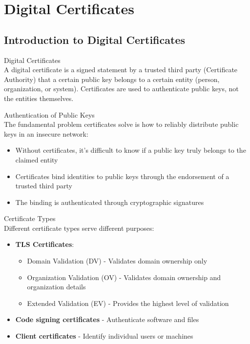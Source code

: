\section{Digital Certificates}

\subsection{Introduction to Digital Certificates}

\begin{definition}{Digital Certificates}\\
A digital certificate is a signed statement by a trusted third party (Certificate Authority) that a certain public key belongs to a certain entity (person, organization, or system). Certificates are used to authenticate public keys, not the entities themselves.
\end{definition}

\begin{concept}{Authentication of Public Keys}\\
The fundamental problem certificates solve is how to reliably distribute public keys in an insecure network:
\begin{itemize}
    \item Without certificates, it's difficult to know if a public key truly belongs to the claimed entity
    \item Certificates bind identities to public keys through the endorsement of a trusted third party
    \item The binding is authenticated through cryptographic signatures
\end{itemize}
\end{concept}

\begin{definition}{Certificate Types}\\
Different certificate types serve different purposes:
\begin{itemize}
    \item \textbf{TLS Certificates}:
    \begin{itemize}
        \item Domain Validation (DV) - Validates domain ownership only
        \item Organization Validation (OV) - Validates domain ownership and organization details
        \item Extended Validation (EV) - Provides the highest level of validation
    \end{itemize}
    \item \textbf{Code signing certificates} - Authenticate software and files
    \item \textbf{Client certificates} - Identify individual users or machines
\end{itemize}
\end{definition}

